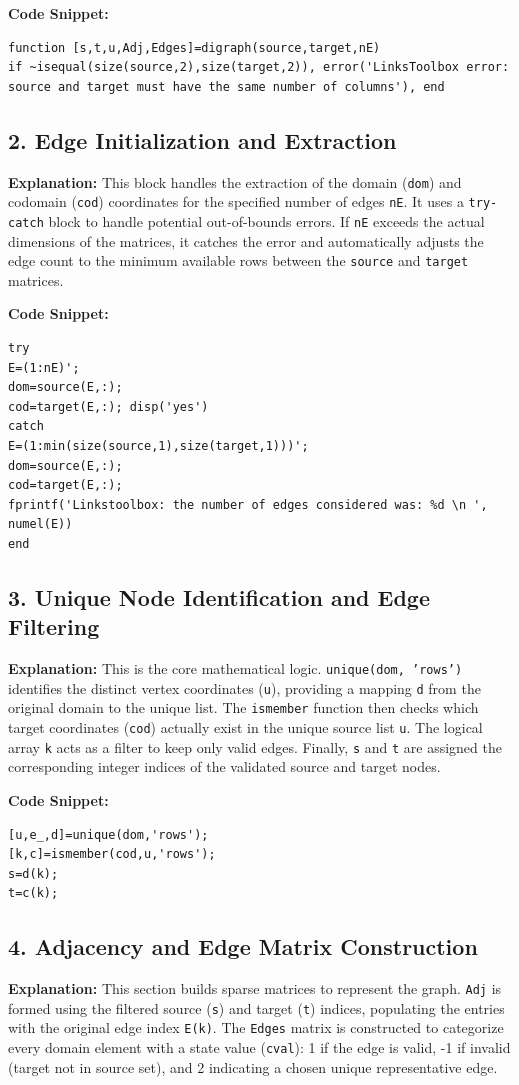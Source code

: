\textbf{Code Snippet:}
\begin{lstlisting}
function [s,t,u,Adj,Edges]=digraph(source,target,nE)
if ~isequal(size(source,2),size(target,2)), error('LinksToolbox error: source and target must have the same number of columns'), end
\end{lstlisting}

\subsection{2. Edge Initialization and Extraction}
\textbf{Explanation:}
This block handles the extraction of the domain (\texttt{dom}) and codomain (\texttt{cod}) coordinates for the specified number of edges \texttt{nE}. It uses a \texttt{try-catch} block to handle potential out-of-bounds errors. If \texttt{nE} exceeds the actual dimensions of the matrices, it catches the error and automatically adjusts the edge count to the minimum available rows between the \texttt{source} and \texttt{target} matrices.

\textbf{Code Snippet:}
\begin{lstlisting}
try
E=(1:nE)';
dom=source(E,:);
cod=target(E,:); disp('yes')
catch
E=(1:min(size(source,1),size(target,1)))';
dom=source(E,:);
cod=target(E,:);
fprintf('Linkstoolbox: the number of edges considered was: %d \n ', numel(E))
end
\end{lstlisting}

\subsection{3. Unique Node Identification and Edge Filtering}
\textbf{Explanation:}
This is the core mathematical logic. \texttt{unique(dom, 'rows')} identifies the distinct vertex coordinates (\texttt{u}), providing a mapping \texttt{d} from the original domain to the unique list. The \texttt{ismember} function then checks which target coordinates (\texttt{cod}) actually exist in the unique source list \texttt{u}. The logical array \texttt{k} acts as a filter to keep only valid edges. Finally, \texttt{s} and \texttt{t} are assigned the corresponding integer indices of the validated source and target nodes.

\textbf{Code Snippet:}
\begin{lstlisting}
[u,e_,d]=unique(dom,'rows');
[k,c]=ismember(cod,u,'rows');
s=d(k);
t=c(k);
\end{lstlisting}

\subsection{4. Adjacency and Edge Matrix Construction}
\textbf{Explanation:}
This section builds sparse matrices to represent the graph. \texttt{Adj} is formed using the filtered source (\texttt{s}) and target (\texttt{t}) indices, populating the entries with the original edge index \texttt{E(k)}. The \texttt{Edges} matrix is constructed to categorize every domain element with a state value (\texttt{cval}): 1 if the edge is valid, -1 if invalid (target not in source set), and 2 indicating a chosen unique representative edge.

